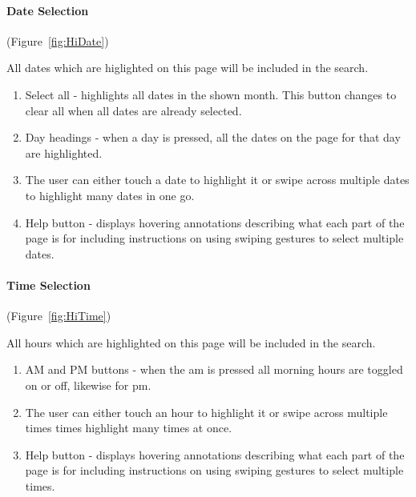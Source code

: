 \paragraph{Date Selection} (Figure~\ref{fig:HiDate})


All dates which are higlighted on this page will be included in the
search.
\begin{enumerate}
	\item Select all - highlights all dates in the shown month. This button
		  changes to clear all when all dates are already selected.
	\item Day headings - when a day is pressed, all the dates on the page for
		  that day are highlighted.
	\item The user can either touch a date to highlight it or swipe across multiple
		  dates to highlight many dates in one go.
	\item Help button - displays hovering annotations describing what each part
		  of the page is for including instructions on using swiping gestures
		  to select multiple dates.
\end{enumerate}

\paragraph{Time Selection} (Figure~\ref{fig:HiTime})


All hours which are highlighted on this page will be included in the
search.
\begin{enumerate}
	\item AM and PM buttons - when the am is pressed all morning hours are toggled
		  on or off, likewise for pm.
	\item The user can either touch an hour to highlight it or swipe across
		  multiple times times highlight many times at once.
	\item Help button - displays hovering annotations describing what each part
		  of the page is for including instructions on using swiping gestures
		  to select multiple times.
\end{enumerate}

